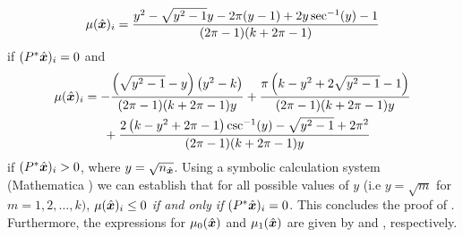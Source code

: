 \begin{equation}
    \label{eq:simplified_mean0}
    \mu(\hat{\boldsymbol{x}})_i = \frac{y^2-\sqrt{y^2-1} y-2 \pi  (y-1)+2 y \sec ^{-1}(y)-1}{(2 \pi -1) (k+2 \pi -1)}
\end{equation}
if $(P^* \hat{\boldsymbol{x}})_i = 0$ and 
\begin{align}
    \label{eq:simplified_mean1}
    \mu(\hat{\boldsymbol{x}})_i &= 
    -\frac{\left(\sqrt{y^2-1}-y\right) \left(y^2-k\right)}{(2 \pi -1) (k+2 \pi -1) y} +  \frac{\pi \left(k-y^2+2 \sqrt{y^2-1}-1\right)}{(2 \pi -1) (k+2 \pi -1) y} \nonumber\\&\quad\;\; + \frac{2\left(k-y^2+2 \pi -1\right) \csc ^{-1}(y)-\sqrt{y^2-1}+2 \pi ^2}{(2 \pi -1) (k+2 \pi -1) y}
\end{align}
if $(P^*\hat{\boldsymbol{x}})_i > 0$, where $y = \sqrt{n_{\hat{\boldsymbol{x}}}}$. Using a symbolic calculation system (Mathematica \citet{Mathematica}) we can establish that for all possible values of $y$ (i.e $y=\sqrt{m}$ for $m=1,2,\dots, k)$, $\mu(\hat{\boldsymbol{x}})_i \leq 0$ \textit{if and only if} $(P^* \hat{\boldsymbol{x}})_i = 0$.
This concludes the proof of . Furthermore, the expressions for $\mu_0(\hat{\boldsymbol{x}})$ and $\mu_1(\hat{\boldsymbol{x}})$ are given by  and , respectively.

